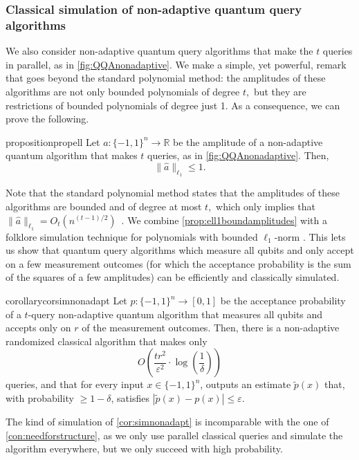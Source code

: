 \documentclass[11pt]{article}
\newcommand{\norm}[1]{\|#1\|}
\newcommand{\R}{\mathbb{R}} %
\newcommand{\1}{\mathbf{1}}
\newcommand{\eps}{\varepsilon}
\theoremstyle{plain}
\theoremstyle{definition}
\theoremstyle{remark}
\begin{document}
\subsubsection{Classical simulation of non-adaptive quantum query algorithms}
We also consider non-adaptive quantum query algorithms that make the $t$ queries in parallel, as in \cref{fig:QQAnonadaptive}. We make a simple, yet powerful, remark that goes beyond the standard polynomial method: the amplitudes of these algorithms are not only bounded polynomials of degree $t,$ but they are restrictions of bounded polynomials of degree just 1. As a consequence, we can prove the following. 

\begin{restatable}{proposition}{propell}\label{prop:ell1boundamplitudes}
    Let $a:\{-1,1\}^n\to\R$ be the amplitude of a non-adaptive quantum algorithm that makes $t$ queries, as in \cref{fig:QQAnonadaptive}. Then, 
    \begin{equation*}
        \norm{\widehat a}_{\ell_1}\leq 1.
    \end{equation*}
\end{restatable}

Note that the standard polynomial method states that the amplitudes of these algorithms are bounded and of degree at most $t,$ which only implies that $\norm{\widehat a}_{\ell_1}=O_{t}(n^{(t-1)/2})$~\cite{iyer2021tight}. We combine \cref{prop:ell1boundamplitudes} with a folklore simulation technique for polynomials with bounded $\ell_1$-norm \cite{grolmusz1997power}. This lets us show that quantum query algorithms which measure all qubits and only accept on a few measurement outcomes (for which the acceptance probability is the sum of the squares of a few amplitudes) can be efficiently and classically simulated. 

\begin{restatable}{corollary}{corsimnonadapt}\label{cor:simnonadapt}
    Let $p:\{-1,1\}^n\to [0,1]$ be the acceptance probability of a $t$-query non-adaptive quantum algorithm that measures all qubits and accepts only on $r$ of the measurement outcomes. Then, there is a non-adaptive randomized classical algorithm that makes only $$O\left(\frac{tr^2}{\eps^2}\cdot\log\left(\frac{1}{\delta}\right)\right)$$ queries, and that for every input $x\in\{-1,1\}^n$, outputs an estimate $\widetilde p(x)$ that, with probability $\geq1-\delta$, satisfies $|\widetilde p(x)-p(x)|\leq \eps.$ 
\end{restatable}

The kind of simulation of \cref{cor:simnonadapt} is incomparable with the one of \cref{con:needforstructure}, as we only use parallel classical queries and simulate the algorithm everywhere, but we only succeed with high probability.
\end{document}
